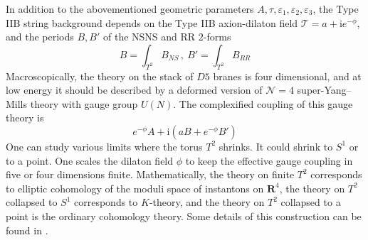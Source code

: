 \documentclass[12pt]{article}
\numberwithin{equation}{section}
\newcommand{\ve}{{\varepsilon}}
\newcommand\beq{\begin{equation}}
\newcommand\eeq{\end{equation}}
\theoremstyle{definition}
\newcommand {\bR}   {\mathbf{R}}
\newcommand {\CalN} {\mathcal N}
\newcommand {\CalT} {\mathcal T}
\newcommand {\ii} {\mathrm{i}}
\begin{document}
In addition to the abovementioned geometric parameters $A, \tau, {\ve}_{1}, {\ve}_{2}, {\ve}_{3}$, the Type IIB string background depends on the Type IIB axion-dilaton field $\CalT = a + {\ii} e^{-\phi}$, and the periods $B, B'$ of the NSNS and RR $2$-forms
\beq
B = \int_{T^2} B_{NS}\, , \ B' = \int_{T^2} B_{RR}
\eeq
Macroscopically, the theory on the stack of $D5$ branes is four dimensional, and at low energy
it should be described by a deformed version of ${\CalN}=4$ super-Yang--Mills theory with 
gauge group $U(N)$. The complexified coupling of this gauge theory is 
\beq
e^{-\phi} A + {\ii} \left( a B + e^{-\phi} B' \right)  
\eeq 
One can study various limits where the torus $T^2$ shrinks. It could shrink to $S^1$ or to a point. One scales the dilaton field $\phi$ to keep the effective gauge coupling in five or four dimensions
finite. Mathematically, the theory on finite $T^2$ corresponds to elliptic cohomology of the moduli space of instantons on ${\bR}^{4}$, the theory on $T^2$ collapsed to $S^1$ corresponds to $K$-theory, and the theory on $T^2$ collapsed to a point is the ordinary cohomology theory. 
Some details of this construction can be found in \cite{Nekrasov:1996cz,Baulieu:1997nj}.
\end{document}
